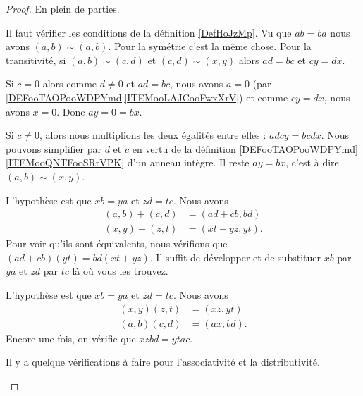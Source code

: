 \begin{proof}
	En plein de parties.
	\begin{subproof}
		Il faut vérifier les conditions de la définition \ref{DefHoJzMp}. Vu que \( ab=ba\) nous avons \( (a,b)\sim (a,b)\). Pour la symétrie c'est la même chose. Pour la transitivité, si \( (a,b)\sim(c,d)\) et \( (c,d)\sim(x,y)\) alors \( ad=bc\) et \( cy=dx\).

		Si \( c=0\) alors comme \( d\neq 0\) et \( ad=bc\), nous avons \( a=0\) (par \ref{DEFooTAOPooWDPYmd}\ref{ITEMooLAJCooFwxXrV}) et comme \( cy=dx\), nous avons \( x=0\). Donc \( ay=0=bx\).

		Si \( c\neq 0\), alors nous multiplions les deux égalités entre elles : \( adcy=bcdx\). Nous pouvons simplifier par \( d\) et \( c\) en vertu de la définition \ref{DEFooTAOPooWDPYmd}\ref{ITEMooQNTFooSRrVPK} d'un anneau intègre. Il reste \( ay=bx\), c'est à dire \( (a,b)\sim(x,y)\).

		L'hypothèse est que \( xb=ya\) et \( zd=tc\). Nous avons
		\begin{subequations}
			\begin{align}
				(a,b)+(c,d) & =(ad+cb,bd)  \\
				(x,y)+(z,t) & =(xt+yz,yt).
			\end{align}
		\end{subequations}
		Pour voir qu'ils sont équivalents, nous vérifions que \( (ad+cb)(yt)=bd(xt+yz)\). Il suffit de développer et de substituer \( xb\) par \( ya\) et \( zd\) par \( tc\) là où vous les trouvez.

		L'hypothèse est que \( xb=ya\) et \( zd=tc\). Nous avons
		\begin{subequations}
			\begin{align}
				(x,y)(z,t) & =(xz,yt)  \\
				(a,b)(c,d) & =(ax,bd).
			\end{align}
		\end{subequations}
		Encore une fois, on vérifie que \( xzbd=ytac\).

		Il y a quelque vérifications à faire pour l'associativité et la distributivité.


\end{subproof}
\end{proof}
